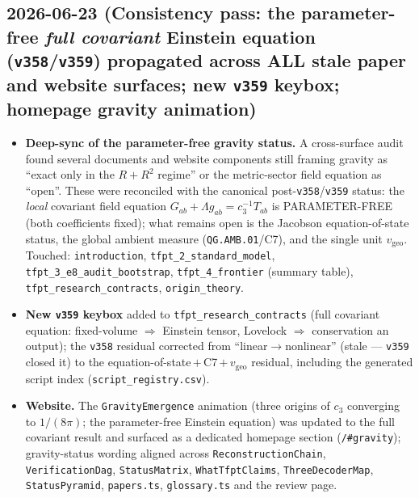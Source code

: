 \documentclass[11pt]{article}
\providecommand{\vref}[1]{\texttt{#1}}
\providecommand{\cthree}{c_3}\providecommand{\phiz}{\varphi_0^{\mathrm{ret}}}
\begin{document}
\subsection*{2026-06-23 (Consistency pass: the parameter-free \emph{full covariant} Einstein equation (\texttt{v358}/\texttt{v359}) propagated across ALL stale paper and website surfaces; new \texttt{v359} keybox; homepage gravity animation)}
\begin{itemize}
\item \textbf{Deep-sync of the parameter-free gravity status.} A cross-surface audit found several
documents and website components still framing gravity as ``exact only in the $R+R^2$ regime'' or the
metric-sector field equation as ``open''. These were reconciled with the canonical post-\vref{v358}/\vref{v359}
status: the \emph{local} covariant field equation $G_{ab}+\Lambda g_{ab}=\cthree^{-1}T_{ab}$ is
PARAMETER-FREE (both coefficients fixed); what remains open is the Jacobson equation-of-state status, the
global ambient measure (\texttt{QG.AMB.01}/C7), and the single unit $v_{\mathrm{geo}}$. Touched:
\texttt{introduction}, \texttt{tfpt\_2\_standard\_model}, \texttt{tfpt\_3\_e8\_audit\_bootstrap},
\texttt{tfpt\_4\_frontier} (summary table), \texttt{tfpt\_research\_contracts}, \texttt{origin\_theory}.
\item \textbf{New \texttt{v359} keybox} added to \texttt{tfpt\_research\_contracts} (full covariant equation:
fixed-volume $\Rightarrow$ Einstein tensor, Lovelock $\Rightarrow$ conservation an output); the \vref{v358}
residual corrected from ``linear$\to$nonlinear'' (stale --- \vref{v359} closed it) to the
equation-of-state\,$+$\,C7\,$+\,v_{\mathrm{geo}}$ residual, including the generated script index
(\texttt{script\_registry.csv}).
\item \textbf{Website.} The \texttt{GravityEmergence} animation (three origins of $\cthree$ converging to
$1/(8\pi)$; the parameter-free Einstein equation) was updated to the full covariant result and surfaced as a
dedicated homepage section (\texttt{/\#gravity}); gravity-status wording aligned across
\texttt{ReconstructionChain}, \texttt{VerificationDag}, \texttt{StatusMatrix}, \texttt{WhatTfptClaims},
\texttt{ThreeDecoderMap}, \texttt{StatusPyramid}, \texttt{papers.ts}, \texttt{glossary.ts} and the review page.
\end{itemize}
\end{document}
